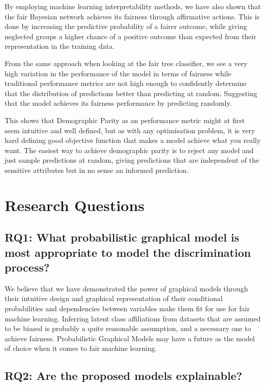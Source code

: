 By employing machine learning interpretability methods, we have also shown that the fair Bayesian network achieves its fairness through affirmative actions. This is done by increasing the predictive probability of a fairer outcome, while giving neglected groups a higher chance of a positive outcome than expected from their representation in the training data.

From the same approach when looking at the fair tree classifier, we see a very high variation in the performance of the model in terms of fairness while traditional performance metrics are not high enough to confidently determine that the distribution of predictions better than predicting at random. Suggesting that the model achieves its fairness performance by predicting randomly. 

This shows that Demographic Parity as an performance metric might at first seem intuitive and well defined, but as with any optimisation problem, it is very hard defining good objective function that makes a model achieve what you really want. The easiest way to achieve demographic parity is to reject any model and just sample predictions at random, giving predictions that are independent of the sensitive attributes but in no sense an informed prediction.

\section{Research Questions}

\subsection{RQ1: What probabilistic graphical model is most appropriate to model the discrimination process?}

We believe that we have demonstrated the power of graphical models through their intuitive design and graphical representation of their conditional probabilities and dependencies between variables make them fit for use for fair machine learning. Inferring latent class affiliations from datasets that are assumed to be biased is probably a quite reasonable assumption, and a necessary one to achieve fairness. Probabilistic Graphical Models may have a future as the model of choice when it comes to fair machine learning.

\subsection{RQ2: Are the proposed models explainable?}


